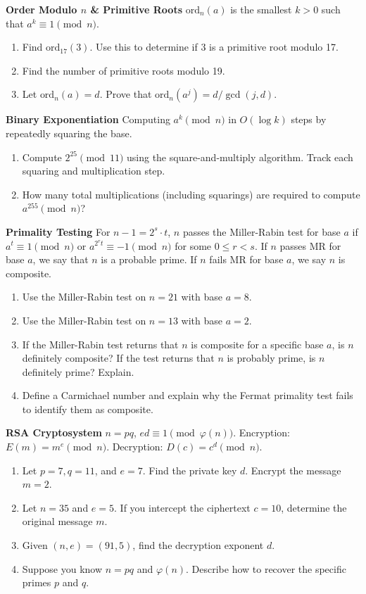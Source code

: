 \documentclass[12pt]{article}
\begin{document}
\textbf{ Order Modulo $n$ \& Primitive Roots}
$\text{ord}_n(a)$ is the smallest $k > 0$ such that $a^k \equiv 1 \pmod{n}$.

\begin{enumerate}
    \item Find $\text{ord}_{17}(3)$. Use this to determine if 3 is a primitive root modulo 17.
    \item Find the number of primitive roots modulo 19.
    \item Let $\text{ord}_n(a) = d$. Prove that $\text{ord}_n(a^j) = d / \gcd(j, d)$.
\end{enumerate}

\textbf{ Binary Exponentiation}
Computing $a^k \pmod{n}$ in $O(\log k)$ steps by repeatedly squaring the base.

\begin{enumerate}
    \item Compute $2^{25} \pmod{11}$ using the square-and-multiply algorithm. Track each squaring and multiplication step.
    \item How many total multiplications (including squarings) are required to compute $a^{255} \pmod{n}$?
\end{enumerate}

\textbf{ Primality Testing}
For $n-1 = 2^s \cdot t$, $n$ passes the Miller-Rabin test for base $a$ if $a^t \equiv 1 \pmod{n}$ or $a^{2^r t} \equiv -1 \pmod{n}$ for some $0 \le r < s$. If $n$ passes MR for base $a$, we say that $n$ is a probable prime. If $n$ fails MR for base $a$, we say $n$ is composite. 

\begin{enumerate}
    \item Use the Miller-Rabin test on $n=21$ with base $a=8$. 
    \item Use the Miller-Rabin test on $n=13$ with base $a=2$.
    \item If the Miller-Rabin test returns that $n$ is composite for a specific base $a$, is $n$ definitely composite? If the test returns that $n$ is probably prime, is $n$ definitely prime? Explain.
    \item Define a Carmichael number and explain why the Fermat primality test fails to identify them as composite.
\end{enumerate}

\textbf{ RSA Cryptosystem}
$n=pq$, $ed \equiv 1 \pmod{\varphi(n)}$. Encryption: $E(m) = m^e \pmod{n}$. Decryption: $D(c) = c^d \pmod{n}$.

\begin{enumerate}
    \item Let $p=7, q=11$, and $e=7$. Find the private key $d$. Encrypt the message $m=2$.
    \item Let $n=35$ and $e=5$. If you intercept the ciphertext $c=10$, determine the original message $m$.
    \item Given $(n, e) = (91, 5)$, find the decryption exponent $d$.
    \item Suppose you know $n=pq$ and $\varphi(n)$. Describe how to recover the specific primes $p$ and $q$.
\end{enumerate}
\end{document}
